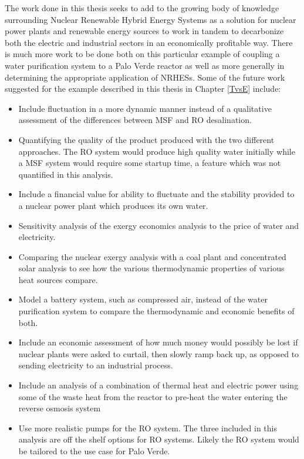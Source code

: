 

The work done in this thesis seeks to add to the growing body of knowledge surrounding Nuclear Renewable Hybrid Energy Systems as a solution for nuclear power plants and renewable energy sources to work in tandem to decarbonize both the electric and industrial sectors in an economically profitable way. There is much more work to be done both on this particular example of coupling a water purification system to a Palo Verde reactor as well as more generally in determining the appropriate application of NRHESs. Some of the future work suggested for the example described in this thesis in Chapter \ref{TvsE}  include:

\begin{itemize}
\item Include fluctuation in a more dynamic manner instead of a qualitative assessment of the differences between MSF and RO desalination.
\item Quantifying the quality of the product produced with the two different approaches.  The RO system would produce high quality water initially while a MSF system would require some startup time, a feature which was not quantified in this analysis.
\item Include a financial value for ability to fluctuate and the stability provided to a nuclear power plant which produces its own water.
\item Sensitivity analysis of the exergy economics analysis to the price of water and electricity.
\item Comparing the nuclear exergy analysis with a coal plant and concentrated solar analysis to see how the various thermodynamic properties of various heat sources compare.
\item Model a battery system, such as compressed air, instead of the water purification system to compare the thermodynamic and economic benefits of both.
\item Include an economic assessment of how much money would possibly be lost if nuclear plants were asked to curtail, then slowly ramp back up, as opposed to sending electricity to an industrial process.
\item Include an analysis of a combination of thermal heat and electric power using some of the waste heat from the reactor to pre-heat the water entering the reverse osmosis system
\item Use more realistic pumps for the RO system.  The three included in this analysis are off the shelf options for RO systems.  Likely the RO system would be tailored to the use case for Palo Verde.

\end{itemize}
